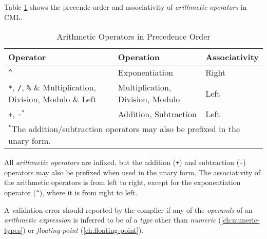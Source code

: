 Table \ref{tab:arithmetic-constraints} shows the precende order and associativity of \emph{arithmetic operators}
in CML.

\begin{table}[H]
\centering
\begin{tabular}
{ l l l }
\hline
Operator & Operation & Associativity \\
\hline
\verb!^! & Exponentiation & Right \\
\verb!*!, \verb!/!, \verb!%! & Multiplication, Division, Modulo & Left  \\
\verb!+!, \verb!-!$^*$ & Addition, Subtraction & Left \\
\multicolumn{3}{l}{\footnotesize{$^*$The addition/subtraction operators
may also be prefixed in the unary form.}}
\end{tabular}
\caption{Arithmetic Operators in Precedence Order}
\label{tab:arithmetic-constraints}
\end{table}

All \emph{arithmetic operators} are infixed,
but the addition (\verb|+|) and subtraction (\verb|-|) operators may also be prefixed when used in the unary form.
The associativity of the arithmetic operators is from left to right,
except for the exponentiation operator (\verb|^|),
where it is from right to left.

A validation error should reported by the compiler if any of the \emph{operands}
of an \emph{arithmetic expression} is inferred to be of a \emph{type}
other than \emph{numeric} (\ref{ch:numeric-types})
or \emph{floating-point} (\ref{ch:floating-point}).
